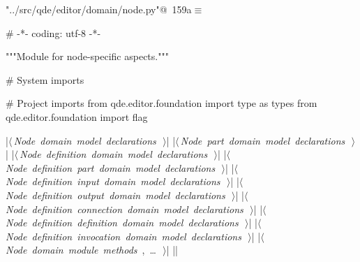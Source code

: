 \documentclass[%
    a4paper,    %
    justified,  %
    nobib,      %
    openany     %
]{tufte-book}
\begin{document}
\begin{flushleft} \small
\begin{minipage}{\linewidth}\label{scrap187}\raggedright\small
{} \verb@"../src/qde/editor/domain/node.py"@\nobreak\ {\footnotesize {159a}}$\equiv$
\vspace{-1ex}
\begin{pythoncode}
# -*- coding: utf-8 -*-

"""Module for node-specific aspects."""

# System imports

# Project imports
from qde.editor.foundation import type as types
from qde.editor.foundation import flag

|\hbox{$\langle\,${\itshape Node domain model declarations}\nobreak\ {\footnotesize {}}$\,\rangle$}|
|\hbox{$\langle\,${\itshape Node part domain model declarations}\nobreak\ {\footnotesize {}}$\,\rangle$}|
|\hbox{$\langle\,${\itshape Node definition domain model declarations}\nobreak\ {\footnotesize {}}$\,\rangle$}|
|\hbox{$\langle\,${\itshape Node definition part domain model declarations}\nobreak\ {\footnotesize {}}$\,\rangle$}|
|\hbox{$\langle\,${\itshape Node definition input domain model declarations}\nobreak\ {\footnotesize {}}$\,\rangle$}|
|\hbox{$\langle\,${\itshape Node definition output domain model declarations}\nobreak\ {\footnotesize {}}$\,\rangle$}|
|\hbox{$\langle\,${\itshape Node definition connection domain model declarations}\nobreak\ {\footnotesize {}}$\,\rangle$}|
|\hbox{$\langle\,${\itshape Node definition definition domain model declarations}\nobreak\ {\footnotesize {}}$\,\rangle$}|
|\hbox{$\langle\,${\itshape Node definition invocation domain model declarations}\nobreak\ {\footnotesize {}}$\,\rangle$}|
|\hbox{$\langle\,${\itshape Node domain module methods}\nobreak\ {\footnotesize {}, \ldots\ }$\,\rangle$}|
|\NWsep|
\end{pythoncode}
\vspace{1.5ex}
\footnotesize
\begin{list}{}{\setlength{\itemsep}{-\parsep}\setlength{\itemindent}{-\leftmargin}}

\item{}
\end{list}
\end{minipage}\vspace{4ex}
\end{flushleft}
\end{document}
